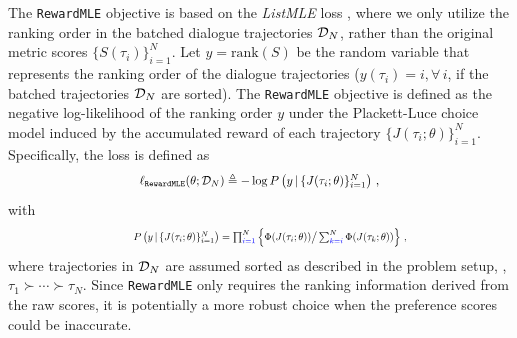 The \texttt{RewardMLE} objective is based on the \textit{ListMLE} loss \citep{listmle2008}, 
where we only utilize the ranking order in the batched dialogue trajectories ${\mathcal{D}}_{N} $, rather than the original metric scores $\{S(\tau_i)\}_{i=1}^{N}$. 
Let $y = \mathrm{rank}(S)$ be the random variable that represents the ranking order of the dialogue trajectories ($y(\tau_i) = i, \forall\, i$, if the batched trajectories ${\mathcal{D}}_{N}$ are sorted). 
The \texttt{RewardMLE} objective is defined as the negative log-likelihood of the ranking order $y$ under the Plackett-Luce choice model \citep{plackett1975analysis,luce2012individual} induced by the accumulated reward of each trajectory $\{J(\tau_i; \theta) \}_{i=1}^N$.
Specifically, the loss is defined as
\begin{equation}\label{eq:listmle}\textstyle
\resizebox{.5\linewidth}{!}{%
$
  \ell_{\texttt{RewardMLE}}(\theta; \gD_{N}) \triangleq -\log P\br{y \given \{J(\tau_i; \theta)\}_{i=1}^{N}}\,,
    $%
}
\end{equation}
with
\begin{equation*}
\resizebox{.61\linewidth}{!}{%
$
   ~~~~~~ P\br{y\given \{J(\tau_i; \theta)\}_{i=1}^{N}} = \prod_{\textcolor{blue}{i=1}}^{N} \cbr{\Phi(J(\tau_i; \theta)) \big/ \sum_{\textcolor{blue}{k=i}}^{N}\Phi(J(\tau_k ; \theta))} \,,
    $%
}
\end{equation*}
where trajectories in ${\mathcal{D}}_{N}$ are assumed sorted as described in the problem setup, \ie, $\tau_1 \succ \cdots \succ \tau_N$. 
Since \texttt{RewardMLE} only requires the ranking information derived from the raw scores,
it is potentially a more robust choice when the preference scores could be inaccurate.


